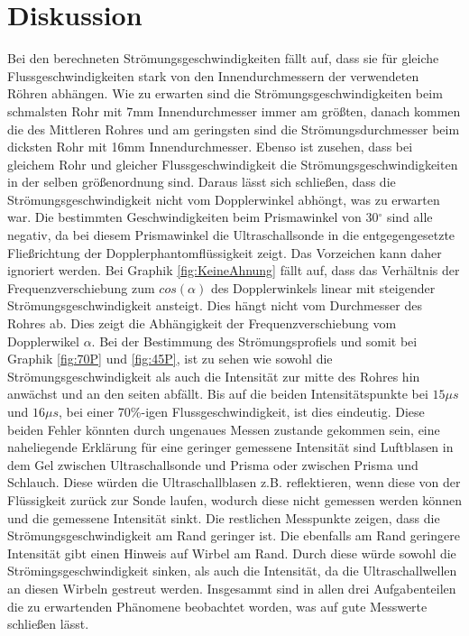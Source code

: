 \section{Diskussion}
\label{sec:Diskussion}

Bei den berechneten Strömungsgeschwindigkeiten fällt auf, dass sie für gleiche Flussgeschwindigkeiten stark von den Innendurchmessern der 
verwendeten Röhren abhängen. Wie zu erwarten sind die Strömungsgeschwindigkeiten beim schmalsten Rohr mit 7mm Innendurchmesser immer am größten, 
danach kommen die des Mittleren Rohres und am geringsten sind die Strömungsdurchmesser beim dicksten Rohr mit 16mm Innendurchmesser.
Ebenso ist zusehen, dass bei gleichem Rohr und gleicher Flussgeschwindigkeit die Strömungsgeschwindigkeiten in der selben größenordnung sind. 
Daraus lässt sich schließen, dass die Strömungsgeschwindigkeit nicht vom Dopplerwinkel abhöngt, was zu erwarten war. Die bestimmten Geschwindigkeiten 
beim Prismawinkel von 30$^{\circ}$ sind alle negativ, da bei diesem Prismawinkel die Ultraschallsonde in die entgegengesetzte Fließrichtung 
der Dopplerphantomflüssigkeit zeigt. Das Vorzeichen kann daher ignoriert werden. 
Bei Graphik \ref{fig:KeineAhnung} fällt auf, dass das Verhältnis der Frequenzverschiebung zum $cos(\alpha)$ des Dopplerwinkels linear mit steigender 
Strömungsgeschwindigkeit ansteigt. Dies hängt nicht vom Durchmesser des Rohres ab. Dies zeigt die Abhängigkeit der Frequenzverschiebung vom 
Dopplerwikel $\alpha$. 
Bei der Bestimmung des Strömungsprofiels und somit bei Graphik \ref{fig:70P} und \ref{fig:45P}, ist zu sehen wie sowohl die Strömungsgeschwindigkeit als auch 
die Intensität zur mitte des Rohres hin anwächst und an den seiten abfällt. Bis auf die beiden Intensitätspunkte bei $15\mu s$ und $16\mu s$, bei 
einer 70\%-igen Flussgeschwindigkeit, ist dies eindeutig. Diese beiden Fehler könnten durch ungenaues Messen zustande gekommen sein, eine 
naheliegende Erklärung für eine geringer gemessene Intensität sind Luftblasen in dem Gel zwischen Ultraschallsonde und Prisma oder 
zwischen Prisma und Schlauch. Diese würden die Ultraschallblasen z.B. reflektieren, wenn diese von der Flüssigkeit zurück zur Sonde laufen, 
wodurch diese nicht gemessen werden können und die gemessene Intensität sinkt.
Die restlichen Messpunkte zeigen, dass die Strömungsgeschwindigkeit am Rand geringer ist. Die ebenfalls am Rand geringere Intensität 
gibt einen Hinweis auf Wirbel am Rand. Durch diese würde sowohl die Strömingsgeschwindigkeit sinken, als auch die Intensität, da 
die Ultraschallwellen an diesen Wirbeln gestreut werden. 
Insgesammt sind in allen drei Aufgabenteilen die zu erwartenden Phänomene beobachtet worden, was auf gute Messwerte schließen lässt.
